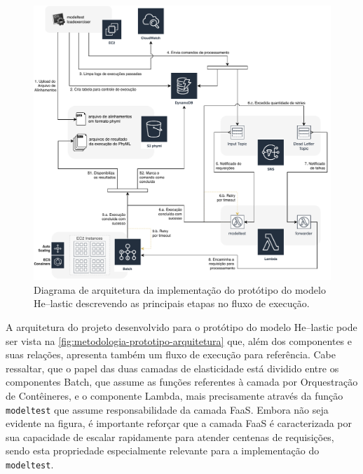 \documentclass[english,brazilian]{UNISINOSmonografia} %
\begin{document}
\begin{figure}[tp]
	\centering%
	\begin{minipage}{\textwidth}
		\caption{Diagrama de arquitetura da implementação do protótipo do modelo \textsf{He}--lastic descrevendo as principais etapas no fluxo de execução.}
		\label{fig:metodologia-prototipo-arquitetura}
		\vspace{1ex}
		\includegraphics[width=\textwidth]{prototipo-arquitetura}
	\end{minipage}
\end{figure}


A arquitetura do projeto desenvolvido para o protótipo do modelo \textsf{He}--lastic pode ser vista na \autoref{fig:metodologia-prototipo-arquitetura} que, além dos componentes e suas relações, apresenta também um fluxo de execução para referência.
%
Cabe ressaltar, que o papel das duas camadas de elasticidade está dividido entre os componentes Batch, que assume as funções referentes à camada por Orquestração de Contêineres, e o componente Lambda, mais precisamente através da função \texttt{modeltest} que assume responsabilidade da camada FaaS.
%
Embora não seja evidente na figura, é importante reforçar que a camada FaaS é caracterizada por sua capacidade de escalar rapidamente para atender centenas de requisições, sendo esta propriedade especialmente relevante para a implementação do \texttt{modeltest}.
\end{document}

